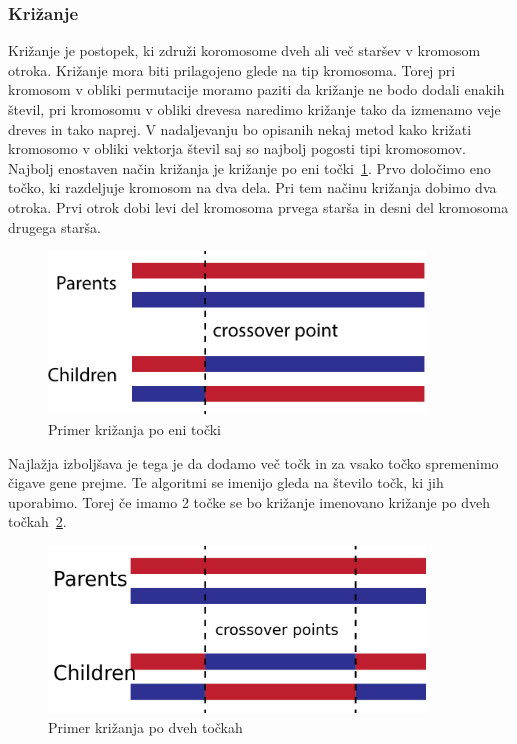 \documentclass[a4paper, 12pt]{book}
\begin{document}
\subsubsection{Križanje}
Križanje je postopek, ki združi koromosome dveh ali več staršev v kromosom otroka. Križanje mora biti prilagojeno glede na tip kromosoma. Torej pri kromosom v obliki permutacije moramo paziti da križanje ne bodo dodali enakih števil, pri kromosomu v obliki drevesa naredimo križanje tako da izmenamo veje dreves in tako naprej. V nadaljevanju bo opisanih nekaj metod kako križati kromosomo v obliki vektorja števil saj so najbolj pogosti tipi kromosomov.
Najbolj enostaven način križanja je križanje po eni točki~\ref{picOnePoint}. Prvo določimo eno točko, ki razdeljuje kromosom na dva dela. Pri tem načinu križanja dobimo dva otroka. Prvi otrok dobi levi del kromosoma prvega starša in desni del kromosoma drugega starša.
\begin{figure}[H]
\begin{center}
\includegraphics[width=10cm]{OnePointCrossover.pdf}
\end{center}
\caption{Primer križanja po eni točki}
\label{picOnePoint}
\end{figure}
Najlažja izboljšava je tega je da dodamo več točk in za vsako točko spremenimo čigave gene prejme. Te algoritmi se imenijo gleda na število točk, ki jih uporabimo. Torej če imamo 2 točke se bo križanje imenovano križanje po dveh točkah~\ref{picTwoPoint}.
\begin{figure}[H]
\begin{center}
\includegraphics[width=10cm]{TwoPointCrossover.png}
\end{center}
\caption{Primer križanja po dveh točkah}
\label{picTwoPoint}
\end{figure}
\end{document}
